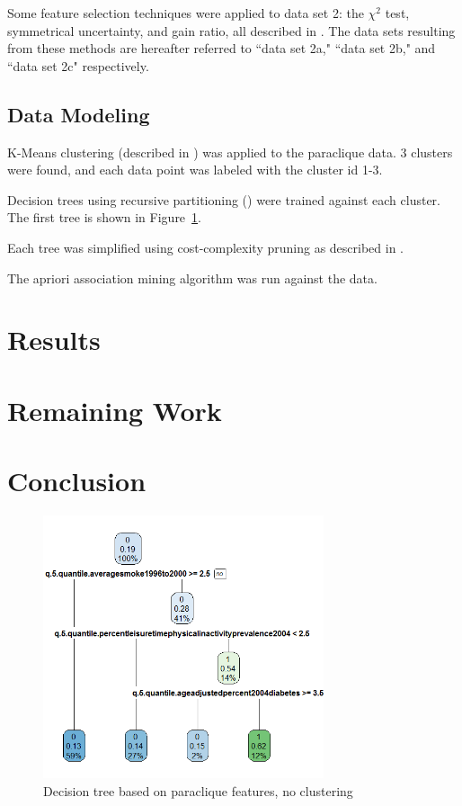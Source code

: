 \documentclass[conference,compsoc]{IEEEtran}
\begin{document}
Some feature selection techniques were applied to data set 2: the ${\chi}^2$ test, symmetrical uncertainty, and gain ratio, all described in \cite{fselector}. The data sets resulting
from these methods are hereafter referred to ``data set 2a," ``data set 2b," and ``data set 2c" respectively.

\subsection{Data Modeling}

K-Means clustering (described in \cite{hartigan}) was applied to the paraclique data. 3 clusters were found, and each data point was labeled with the cluster id 1-3.

Decision trees using recursive partitioning (\cite{rpart}) were trained against each cluster. The first tree is shown in Figure~\ref{decision.tree.01}.

Each tree was simplified using cost-complexity pruning as described in \cite{quinlan}.

The apriori association mining algorithm was run against the data.

\section{Results}

\section{Remaining Work}

\section{Conclusion}

\begin{figure}[!t]
\centering
\includegraphics[width=3.25in]{decision-tree-01-paraclique-no-clustering.png}
\caption{Decision tree based on paraclique features, no clustering}
\label{decision.tree.01}
\end{figure}
\end{document}

